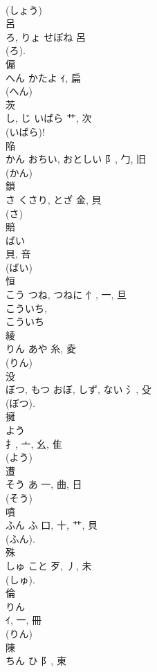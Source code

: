 \documentclass[8pt]{extreport}
\begin{document}
\begin{CJK}{UTF8}{min}
\\	(しょう) 
\\	呂	
\\	ろ, りょ	せぼね	呂	
\\	(ろ). 
\\	偏	
\\	へん	かたよ	ｲ, 扁	
\\	(へん) 
\\	茨	
\\	し, じ	いばら	艹, 次	
\\	(いばら)! 
\\	陥	
\\	かん	おちい, おとしい	阝, 勹, 旧	
\\	(かん) 
\\	鎖	
\\	さ	くさり, とざ	金, 貝		
\\	(さ) 
\\	賠	
\\	ばい	
\\	貝, 咅	
\\	(ばい)
\\	恒	
\\	こう	つね, つねに	忄, 一, 旦	
\\	こういち, 
\\	こういち 
\\	綾	
\\	りん	あや	糸, 夌	
\\	(りん) 
\\	没	
\\	ぼつ, もつ	おぼ, しず, ない	氵, 殳	
\\	(ぼつ). 
\\	擁	
\\	よう	
\\	扌, 亠, 幺, 隹	
\\	(よう) 
\\	遭	
\\	そう	あ	一, 曲, 日		
\\	(そう) 
\\	噴	
\\	ふん	ふ	口, 十, 艹, 貝	
\\	(ふん).	
\\	殊	
\\	しゅ	こと	歹, 丿, 未	
\\	(しゅ). 
\\	倫	
\\	りん	
\\	ｲ, 一, 冊		
\\	(りん) 
\\	陳	
\\	ちん	ひ	阝, 東	

\end{CJK}
\end{document}
